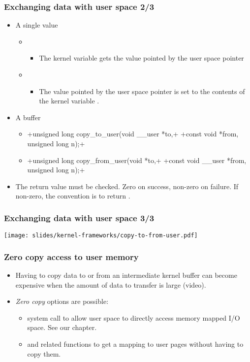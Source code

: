 \begin{frame}[fragile]
  \frametitle{Exchanging data with user space 2/3}
  \begin{itemize}
  \item A single value
    \begin{itemize}
    \item {}
      \begin{itemize}
      \item The kernel variable  gets the value pointed by the
        user space pointer 
      \end{itemize}
    \item {}
      \begin{itemize}
      \item The value pointed by the user space pointer  is
        set to the contents of the kernel variable .
      \end{itemize}
    \end{itemize}
  \item A buffer
    \begin{itemize}
    \item {}+unsigned long copy_to_user(void __user *to,+
      +const void *from, unsigned long n);+
    \item {}+unsigned long copy_from_user(void *to,+
      +const void __user *from, unsigned long n);+
    \end{itemize}
  \item The return value must be checked. Zero on success, non-zero on
    failure. If non-zero, the convention is to return \code{-}.
  \end{itemize}
\end{frame}

\begin{frame}
 \frametitle{Exchanging data with user space 3/3}
 \begin{center}
    \texttt{[image: slides/kernel-frameworks/copy-to-from-user.pdf]}
 \end{center}
\end{frame}

\begin{frame}
  \frametitle{Zero copy access to user memory}
  \begin{itemize}
  \item Having to copy data to or from an intermediate kernel buffer
    can become expensive when the amount of data to transfer is
    large (video).
  \item \emph{Zero copy} options are possible:
    \begin{itemize}
    \item {} system call to allow user space to directly
      access memory mapped I/O space. See our  chapter.
    \item {} and related functions to get a
      mapping to user pages without having to copy them.
    \end{itemize}
  \end{itemize}
\end{frame}

